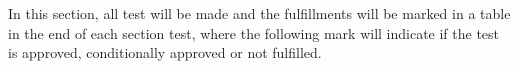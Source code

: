 In this section, all test will be made and the fulfillments will be marked in a table in the end of each section test, where the following mark will indicate if the test is approved, conditionally approved or not fulfilled.
 \vspace{1cm}
    \startexplain
    \stopexplain